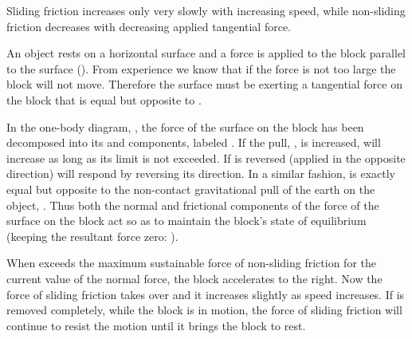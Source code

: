 {Sliding friction increases only very slowly with increasing speed, while non-sliding friction
decreases with decreasing applied tangential force.

%


An object rests on a horizontal surface and a force 
is applied to the block parallel to the surface ().
From experience we know that if the force  is not too large the
block will not move.
Therefore the surface must be exerting a tangential force on the block that
is equal but opposite to .

In the one-body diagram, , the force of the surface on the block has
been decomposed into its  and  components,
labeled .
If the pull, , is increased,  will increase as long as
its limit is not exceeded.
If  is reversed (applied in the opposite direction)  will
respond by reversing its direction.
In a similar fashion,  is exactly equal but opposite to the
non-contact gravitational pull of the earth on the object, .
Thus both the normal and frictional components of the force of the surface
on the block act so as to maintain the block's state of equilibrium
(keeping the resultant force zero: ).

When  exceeds the maximum sustainable force of non-sliding
friction for the current value of the normal force, the block accelerates to
the right.
Now the force of sliding friction takes over and it increases slightly as speed
increases.
If  is removed completely, while the block is in motion, the force
of sliding friction will continue to resist the motion until it brings the
block to rest.
}%
%
